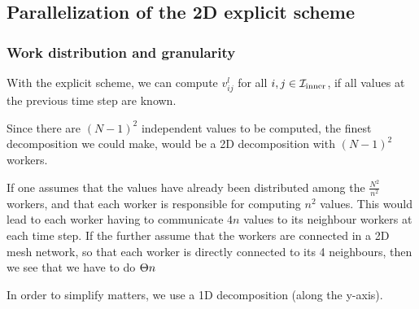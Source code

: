 \subsection{Parallelization of the 2D explicit scheme}
\subsubsection{Work distribution and granularity}
\cite{inf3380_bok}
With the explicit scheme, we can compute $v_{ij}^l$ for all $i, j \in \mathcal{I}_{\mathrm{inner}}$, if all values at the previous time step are known.

Since there are $(N - 1)^2$ independent values to be computed, the finest decomposition we could make, would be a 2D decomposition with $(N - 1)^2$ workers.

If one assumes that the values have already been distributed among the $\frac{N^2}{n^2}$ workers, and that each worker is responsible for computing $n^2$ values. This would lead to each worker having to communicate $4n$ values to its neighbour workers at each time step. If the further assume that the workers are connected in a 2D mesh network, so that each worker is directly connected to its 4 neighbours, then we see that we have to do $\Theta n$

In order to simplify matters, we use a 1D decomposition (along the y-axis).
